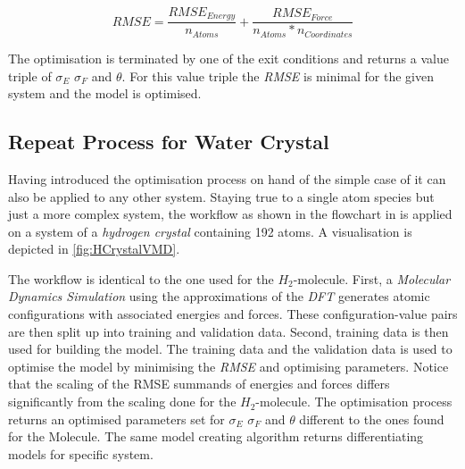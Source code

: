\begin{equation}
	\label{eq:RMSEsum}
	RMSE = \frac{RMSE_{Energy}}{n_{Atoms}} +  \frac{RMSE_{Force}}{n_{Atoms}*n_{Coordinates}} 
\end{equation}

The optimisation is terminated by one of the exit conditions and returns a value triple of $\sigma_E$ $\sigma_F$ and $\theta$. For this value triple the \textit{RMSE} is minimal for the given system and the model is optimised. 



\subsection{Repeat Process for Water Crystal}
\label{subsection:4.2.7}

Having introduced the optimisation process on hand of the simple case of it can also be applied to any other system. Staying true to a single atom species but just a more complex system, the workflow as shown in the flowchart in  is applied on a system of a \textit{hydrogen crystal} containing 192 atoms. A visualisation is depicted in \ref{fig:HCrystalVMD}. 

The workflow is identical to the one used for the $H_2$-molecule. First, a \textit{Molecular Dynamics Simulation} using the approximations of the \textit{DFT} generates atomic configurations with associated energies and forces. These configuration-value pairs are then split up into training and validation data. Second, training data is then used for building the model. The training data and the validation data is used to optimise the model by minimising the \textit{RMSE} and optimising parameters. Notice that the scaling of the RMSE summands of energies and forces differs significantly from the scaling done for the  $H_2$-molecule. The optimisation process returns an optimised parameters set for  $\sigma_E$ $\sigma_F$ and $\theta$ different to the ones found for the Molecule. The same model creating algorithm returns differentiating models for specific system. 





























